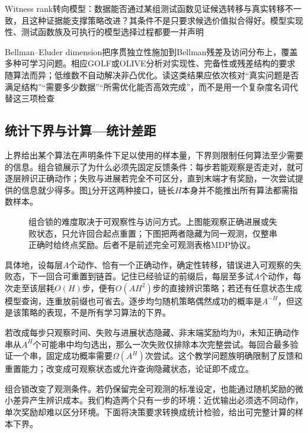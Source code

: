 Witness rank转向模型：数据能否通过某组测试函数见证候选转移与真实转移不一致，且这种证据能支撑策略改进？其条件不是只要求候选价值拟合得好。模型实现性、测试函数族及可执行的模型选择过程都要一并声明

Bellman--Eluder dimension把序贯独立性施加到Bellman残差及访问分布上，覆盖多种可学习问题。相应GOLF或OLIVE分析对实现性、完备性或残差结构的要求随算法而异；低维数不自动解决非凸优化。读这类结果应依次核对“真实问题是否满足结构”“需要多少数据”“所需优化能否高效完成”，而不是用一个复杂度名词代替这三项检查

\subsection{统计下界与计算—统计差距}
\label{sec:rl-learning-statistical-lower}

上界给出某个算法在声明条件下足以使用的样本量，下界则限制任何算法至少需要的信息。组合锁展示了为什么必须先固定反馈条件：每步若能观察是否走对，就可逐层辨识正确动作；失败与进展若完全不可区分，直到末端才有奖励，一次尝试提供的信息就少得多。图\ref{fig:rl-learning-combination-lock}分开这两种接口，链长$H$本身并不能推出所有算法都需指数样本。

\begin{figure}[t]
  \centering
  
  \caption{组合锁的难度取决于可观察性与访问方式。上图能观察正确进展或失败状态，只允许回合起点重置；下图把两者隐藏为同一观测，仅整串正确时给终点奖励。后者不是前述完全可观测表格MDP协议。}
  \label{fig:rl-learning-combination-lock}
\end{figure}

具体地，设每层$A$个动作、恰有一个正确动作，确定性转移，错误进入可观察的失败态，下一回合可重置到链首。记住已经验证的前缀后，每层至多试$A$个动作，每次走至该层耗$O(H)$步，便有$O(AH^2)$步的直接辨识策略；若还有任意状态生成模型查询，连重放前缀也可省去。逐步均匀随机策略偶然成功的概率是$A^{-H}$，但这是该策略的表现，不是所有学习算法的下界。

若改成每步只观察时间、失败与进展状态隐藏、非末端奖励均为0，未知正确动作串从$A^H$个可能串中均匀选出，那么一次失败仅排除本次完整尝试。每回合最多验证一个串，固定成功概率需要$\Omega(A^H)$次尝试。这个教学问题族明确限制了反馈和重置能力；改变成可观察状态或允许查询隐藏状态，论证即不成立。

组合锁改变了观测条件。若仍保留完全可观测的标准设定，也能通过随机奖励的微小差异产生辨识成本。我们构造两个只有一步的环境：近优输出必须选不同动作，单次奖励却难以区分环境。下面将决策要求转换成统计检验，给出可完整计算的样本下界。

